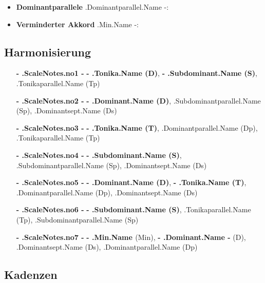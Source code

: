 \documentclass{article}
\begin{document}
\begin{multicols}{2}
\begin{itemize}

\item \textbf{Dominantparallele} {{ .Dominantparallel.Name -}}: 


\item \textbf{Verminderter Akkord} {{ .Min.Name -}}: 


\end{itemize}

\columnbreak

\subsection*{Harmonisierung}

\begin{itemize}
\item[\Large\textbf{ {{- .ScaleNotes.no1 -}} }] \textbf{ {{- .Tonika.Name }} (D)}, \textbf{ {{- .Subdominant.Name }} (S)}, {{ .Tonikaparallel.Name }} (Tp)
\item[\Large\textbf{ {{- .ScaleNotes.no2 -}} }] \textbf{ {{- .Dominant.Name }} (D)}, {{ .Subdominantparallel.Name }} (Sp), {{ .Dominantsept.Name }} (Ds)
\item[\Large\textbf{ {{- .ScaleNotes.no3 -}} }] \textbf{ {{- .Tonika.Name }} (T)}, {{ .Dominantparallel.Name }} (Dp), {{ .Tonikaparallel.Name }} (Tp)
\item[\Large\textbf{ {{- .ScaleNotes.no4 -}} }] \textbf{ {{- .Subdominant.Name }} (S)}, {{ .Subdominantparallel.Name }} (Sp), {{ .Dominantsept.Name }} (Ds)
\item[\Large\textbf{ {{- .ScaleNotes.no5 -}} }] \textbf{ {{- .Dominant.Name }} (D)}, \textbf{ {{- .Tonika.Name }} (T)}, {{ .Dominantparallel.Name }} (Dp), {{ .Dominantsept.Name }} (Ds)
\item[\Large\textbf{ {{- .ScaleNotes.no6 -}} }] \textbf{ {{- .Subdominant.Name }} (S)}, {{ .Tonikaparallel.Name }} (Tp), {{ .Subdominantparallel.Name }} (Sp)
\item[\Large\textbf{ {{- .ScaleNotes.no7 -}} }] \textbf{ {{- .Min.Name }} } (Min), \textbf{ {{- .Dominant.Name -}} } (D), {{ .Dominantsept.Name }} (Ds), {{ .Dominantparallel.Name }} (Dp)
\end{itemize}


\subsection*{Kadenzen}


\end{multicols}
\end{document}
